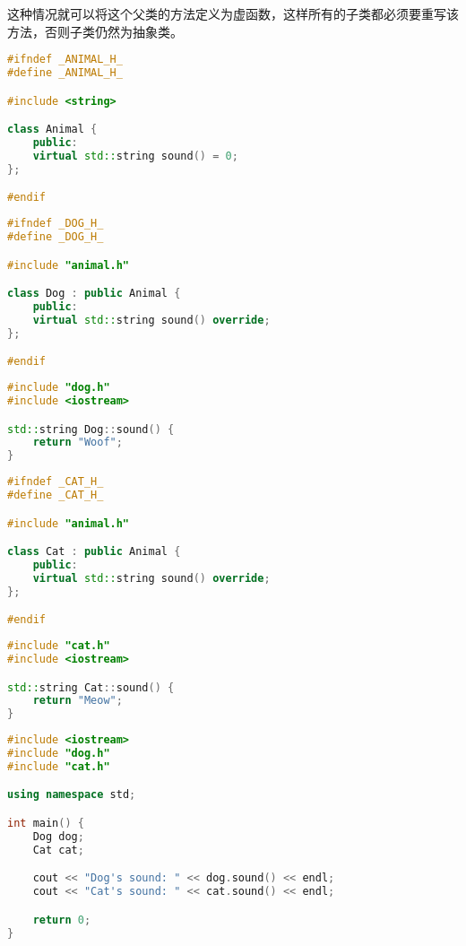 这种情况就可以将这个父类的方法定义为虚函数，这样所有的子类都必须要重写该方法，否则子类仍然为抽象类。\\


\begin{lstlisting}[language=C++]
#ifndef _ANIMAL_H_
#define _ANIMAL_H_

#include <string>

class Animal {
    public:
    virtual std::string sound() = 0;
};

#endif
\end{lstlisting}

\begin{lstlisting}[language=C++]
#ifndef _DOG_H_
#define _DOG_H_

#include "animal.h"

class Dog : public Animal {
    public:
    virtual std::string sound() override;
};

#endif
\end{lstlisting}

\begin{lstlisting}[language=C++]
#include "dog.h"
#include <iostream>

std::string Dog::sound() {
    return "Woof";
}
\end{lstlisting}

\begin{lstlisting}[language=C++]
#ifndef _CAT_H_
#define _CAT_H_

#include "animal.h"

class Cat : public Animal {
    public:
    virtual std::string sound() override;
};

#endif
\end{lstlisting}

\begin{lstlisting}[language=C++]
#include "cat.h"
#include <iostream>

std::string Cat::sound() {
    return "Meow";
}
\end{lstlisting}

\begin{lstlisting}[language=C++]
#include <iostream>
#include "dog.h"
#include "cat.h"

using namespace std;

int main() {
    Dog dog;
    Cat cat;

    cout << "Dog's sound: " << dog.sound() << endl;
    cout << "Cat's sound: " << cat.sound() << endl;

    return 0;
}
\end{lstlisting}

